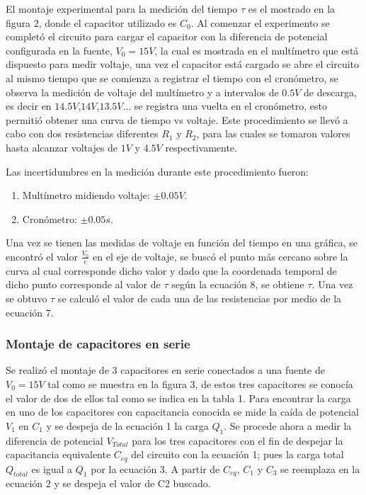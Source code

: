 \documentclass[10pt,letter]{article}
\begin{document}
\begin{multicols}{2}
El montaje experimental para la medición del tiempo $\tau$ es el mostrado en la figura 2, donde el capacitor utilizado es $C_0$. Al comenzar el experimento se completó el circuito para cargar el capacitor con la diferencia de potencial configurada en la fuente, $V_0=15V$, la cual es mostrada en el multímetro que está dispuesto para medir voltaje, una vez el capacitor está cargado se abre el circuito al mismo tiempo que se comienza a registrar el tiempo con el cronómetro, se observa la medición de voltaje del multímetro  y a intervalos de $0.5V$ de descarga, es decir en $14.5V$,$14V$,$13.5V \dots$ se registra una vuelta en el cronómetro, esto permitió obtener una curva de tiempo vs voltaje. Este procedimiento se llevó a cabo con dos resistencias diferentes $R_1$ y $R_2$, para las cuales se tomaron valores hasta alcanzar voltajes de $1V$ y $4.5V$ respectivamente.

\bigskip

Las incertidumbres en la medición durante este procedimiento fueron:
\begin{enumerate}
\itemsep=0em
\item Multímetro midiendo voltaje: $\pm 0.05V$.
\item Cronómetro: $\pm 0.05s$.
\end{enumerate}

Una vez se tienen las medidas de voltaje en función del tiempo en una gráfica, se encontró el valor $\frac{V_0}{e}$ en el eje de voltaje, se buscó el punto más cercano sobre la curva al cual corresponde dicho valor y dado que la coordenada temporal de dicho punto corresponde al valor de $\tau$ según la ecuación 8, se obtiene $\tau$. Una vez se obtuvo $\tau$ se calculó el valor de cada una de las resistencias por medio de la ecuación 7.


\subsubsection{Montaje de capacitores en serie}

Se realizó el montaje de 3 capacitores en serie conectados a una fuente de $V_0=15V$ tal como se muestra en la figura 3, de estos tres capacitores se conocía el valor de dos de ellos tal como se indica en la tabla 1. Para encontrar la carga en uno de los capacitores con capacitancia conocida se mide la caída de potencial $V_1$ en $C_1$ y se despeja de la ecuación 1 la carga $Q_1$. Se procede ahora a medir la  diferencia de potencial $V_{Total}$ para los tres capacitores con el fin de despejar la capacitancia equivalente $C_{eq}$ del circuito con la ecuación 1; pues la carga total $Q_{total}$ es igual a $Q_1$ por la ecuación 3. A partir de $C_{eq}$, $C_1$ y $C_3$ se reemplaza en la ecuación 2 y se despeja el valor de C2 buscado.



\end{multicols}
\end{document}
